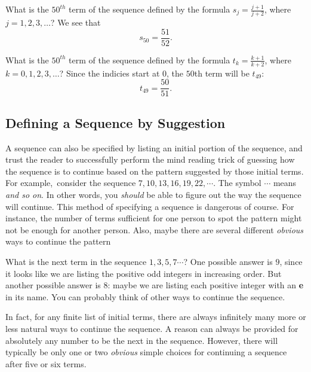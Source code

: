 \begin{exmp}
 What is the $50^{th}$ term of the sequence defined by the formula 
 $\displaystyle s_j = \frac{j+1}{j+2}$, where $j=1,2,3,\ldots$? We
 see that
 \[
 s_{50} = \frac{51}{52}.
\]
\end{exmp}

\begin{exmp}
 What is the $50^{th}$ term of the sequence defined by the formula 
 $\displaystyle t_k = \frac{k+1}{k+2}$, where $k=0,1,2,3,\ldots$? 
 Since the indicies start at $0$, the $50$th term will be $t_{49}$:
 \[
 t_{49} = \frac{50}{51}.
\]
\end{exmp}

\subsection{Defining a Sequence by Suggestion}
A sequence can also be specified by listing an initial portion
of the sequence, and trust the reader to successfully perform the
mind reading trick of guessing how the sequence is to continue
based on the pattern suggested by those initial terms. For example,\
consider the sequence $7,10,13,16,19,22,\cdots$. The symbol $\cdots$
means {\itshape and so on}. In other words, you {\it should} be able to figure
out the way the sequence will continue. This method of specifying
a sequence is dangerous of course. For instance, the number of terms 
sufficient for  one person to spot the pattern might not be 
enough for another person. Also, maybe there are several different
{\itshape obvious} ways to continue the pattern

\begin{exmp}
 What is the next term in the sequence $1,3,5,7\cdots$?
 One possible answer is $9$, since it looks like we are listing the positive
 odd integers in increasing order. But another possible answer is $8$: 
 maybe we are listing each positive integer with an {\bfseries e} in its name.
 You can probably think of other ways to continue the sequence. 
 \end{exmp}
 
 In fact,
 for any finite list of initial terms, there are always infinitely
 many more or less natural ways to continue the sequence. A reason can
 always be provided for absolutely any number to be the next in the 
 sequence. However, there will typically be only one or two {\itshape obvious}
 simple choices for continuing a sequence after five or six terms.   
  
 
